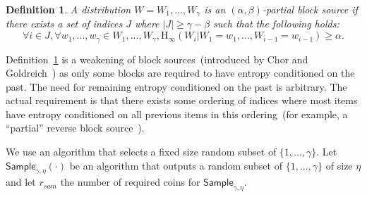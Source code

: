 \documentclass[11pt]{article}
\newcommand{\defref}[1]{\mbox{Definition~\ref{#1}}}
\newcommand{\class}[1]{{\ensuremath{\mathsf{#1}}}}
\newcommand{\sample}{\ensuremath{\class{Sample}}\xspace}
\newcommand{\Hoo}{\mathrm{H}_\infty}
\newtheorem{definition}[theorem]{Definition}
\newcommand{\authnote}[2]{{\textcolor{red}{\textsf{#1 notes: }\textcolor{blue}{ #2}}\marginpar{\textcolor{red}{\textbf{!!!!!}}}}}
\newcommand{\authnote}[2]{}
\newcommand{\lnote}[1]{{\authnote{Leo}{#1}}}
\begin{document}
\begin{definition}
\label{def:partial source}
A distribution $W = W_1,..., W_\gamma$ is an $(\alpha, \beta)$-partial block source if there exists a set of indices $J$ where $|J| \geq \gamma - \beta$ such that the following holds:
\[
\forall i\in J, \forall w_1,..., w_\gamma \in W_1,..., W_\gamma, \Hoo(W_i | W_1 = w_1,..., W_{i-1}=w_{i-1}) \geq \alpha.
\]
\end{definition}

\defref{def:partial source} is a weakening of block sources~(introduced by Chor and Goldreich~\cite{DBLP:journals/siamcomp/ChorG88}) as only some blocks are required to have entropy conditioned on the past.  The need for remaining entropy conditioned on the past is arbitrary.  The actual requirement is that there exists some ordering of indices where most items have entropy conditioned on all previous items in this ordering~(for example, a ``partial'' reverse block source~\cite{vadhan2003constructing}).

We use an algorithm that selects a fixed size random subset of $\{1,..., \gamma\}$.  Let $\sample_{\gamma, \eta}(\cdot)$ be an algorithm that outputs a random subset of $\{1,..., \gamma\}$ of size $\eta$ and let $r_{sam}$ the number of required coins for $\sample_{\gamma, \eta}$.
\end{document}
